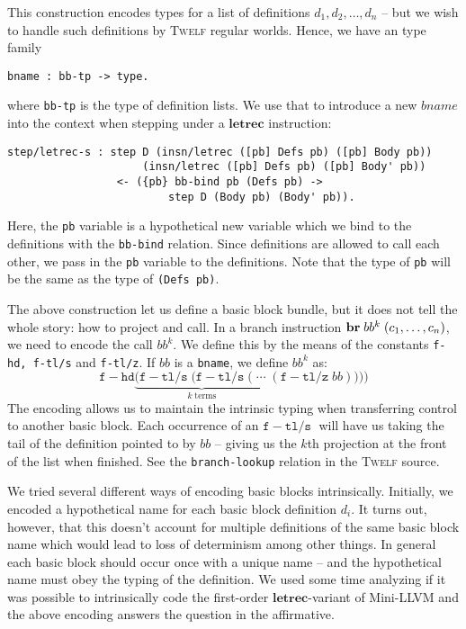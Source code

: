 \documentclass[a4paper, oneside, 10pt, draft]{memoir}
\newcommand{\twelf}{\textsc{Twelf}}
\begin{document}
This construction encodes types for a list of definitions $d_1, d_2,
\dotsc, d_n$ -- but we wish to handle such definitions by \twelf{}
regular worlds. Hence, we have an type family
\begin{verbatim}
bname : bb-tp -> type.
\end{verbatim}
where \texttt{bb-tp} is the type of definition lists. We use that to
introduce a new $bname$ into the context when stepping under a
$\mathbf{letrec}$ instruction:
\begin{verbatim}
step/letrec-s : step D (insn/letrec ([pb] Defs pb) ([pb] Body pb))
                     (insn/letrec ([pb] Defs pb) ([pb] Body' pb))
                 <- ({pb} bb-bind pb (Defs pb) ->
                         step D (Body pb) (Body' pb)).
\end{verbatim}
Here, the \texttt{pb} variable is a hypothetical new variable which we
bind to the definitions with the \texttt{bb-bind} relation. Since
definitions are allowed to call each other, we pass in the \texttt{pb}
variable to the definitions. Note that the type of \texttt{pb} will be
the same as the type of \texttt{(Defs pb)}.

The above construction let us define a basic block bundle, but it does
not tell the whole story: how to project and call. In a branch
instruction $\mathbf{br} \; bb^k \; (c_1, \dotsc, c_n)$, we need to encode the
call $bb^k$. We define this by the means of the constants
\texttt{f-hd, f-tl/s} and \texttt{f-tl/z}. If $bb$ is a
\texttt{bname}, we define $bb^k$ as:
\newcommand{\fhd}{\mathtt{f\!\!-\!\!hd}}
\newcommand{\ftls}{\mathtt{f\!\!-\!\!tl/s}\; }
\newcommand{\ftlz}[1]{(\mathtt{f\!\!-\!\!tl/z} \; #1)}
\begin{equation*}
  \fhd \underbrace{(\ftls(\ftls ( \; \dotsb \; }_{k \; \text{terms}}\ftlz{bb})))
\end{equation*}
The encoding allows us to maintain the intrinsic typing when transferring
control to another basic block. Each occurrence of an $\ftls$ will
have us taking the tail of the definition pointed to by $bb$ -- giving
us the $k$th projection at the front of the list when finished. See
the \texttt{branch-lookup} relation in the \twelf{} source.

We tried several different ways of encoding basic blocks
intrinsically. Initially, we encoded a hypothetical name for
each basic block definition $d_i$. It turns out, however, that this
doesn't account for multiple definitions of the same basic block
name which would lead to loss of determinism among other
things. In general each basic block should occur once with a unique
name -- and the hypothetical name must obey the typing of the
definition. We used some time analyzing if it was possible to
intrinsically code the first-order $\mathbf{letrec}$-variant of
Mini-LLVM and the above encoding answers the question in the
affirmative.
\end{document}
